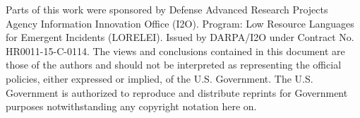 \documentclass[]{article}
\begin{document}
Parts of this work were sponsored by Defense Advanced Research Projects Agency Information Innovation Office  (I2O).  Program:    Low  Resource  Languages for   Emergent   Incidents   (LORELEI).   Issued   by DARPA/I2O  under  Contract  No. HR0011-15-C-0114.  The views and conclusions contained in this document  are  those  of  the  authors  and  should  not be  interpreted  as  representing  the  official  policies, either  expressed  or  implied,  of  the  U.S.  Government.   The  U.S.  Government  is  authorized  to  reproduce and distribute reprints for Government purposes notwithstanding  any copyright  notation here on.

\small



\end{document}
